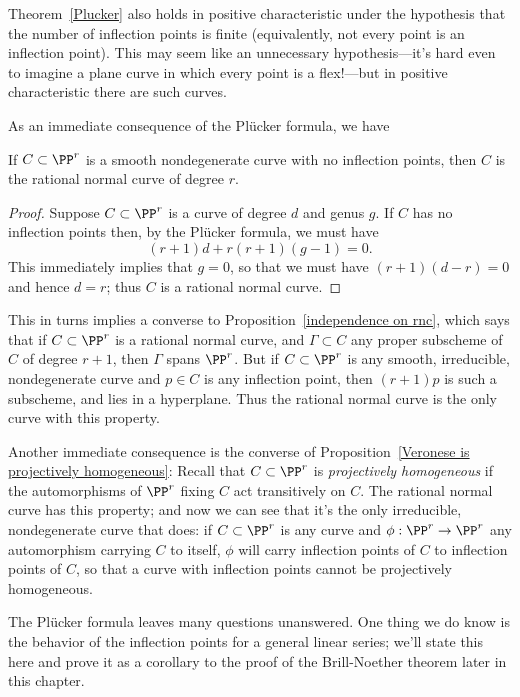 Theorem~\ref{Plucker} also holds in positive characteristic under the hypothesis that the number of inflection points is finite (equivalently, not every point is an inflection point). This may seem like an unnecessary hypothesis---it's hard even to imagine a plane curve in which every point is a flex!---but in positive characteristic there are such curves.

As an immediate consequence of the Pl\"ucker formula, we have

\begin{corollary}\label{uninflected curves}
 If $C\subset \PP^r$ is a smooth nondegenerate curve with no inflection points, then $C$ is the rational normal curve of degree $r$. 
\end{corollary}

\begin{proof}
Suppose $C \subset \PP^r$ is a curve of degree $d$ and genus $g$. If $C$ has no inflection points then, by the Pl\"ucker formula, we must have
$$
(r+1)d + r(r+1)(g-1) = 0.
$$
This immediately implies that $g=0$, so that we must have $(r+1)(d-r) = 0$ and hence $d=r$; thus $C$ is a rational normal curve.
\end{proof}

This in turns implies a converse to  Proposition~\ref{independence on rnc}, which says that if $C \subset \PP^r$ is a rational normal curve, and $\Gamma \subset C$ any proper subscheme of $C$ of degree $r+1$, then $\Gamma$ spans $\PP^r$. But if $C \subset \PP^r$ is any smooth, irreducible, nondegenerate curve and $p \in C$ is any inflection point, then $(r+1)p$ is such a subscheme, and lies in a hyperplane. Thus the rational normal curve is the only curve with this property.


Another immediate consequence is the converse of Proposition~\ref{Veronese is projectively homogeneous}: Recall that $C\subset \PP^r$ is \emph{projectively homogeneous} if the automorphisms of $\PP^r$ fixing
$C$ act transitively on $C$. The rational normal curve has this property; and now we can see that it's the only irreducible, nondegenerate curve that does: if $C \subset \PP^r$ is any curve and $\phi : \PP^r \to \PP^r$ any automorphism carrying $C$ to itself, $\phi$ will carry inflection points of $C$ to inflection points of $C$, so that a curve with inflection points cannot be projectively homogeneous.


The Pl\"ucker formula leaves many questions unanswered. One thing we do know is the behavior of the inflection points for a general linear series; we'll state this here and prove it as a corollary to the proof of the Brill-Noether theorem later in this chapter.

